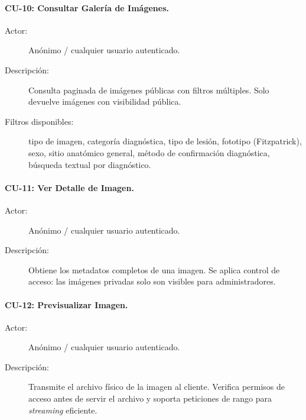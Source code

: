 \paragraph{CU-10: Consultar Galería de Imágenes.}
\begin{description}
    \item[Actor:] Anónimo / cualquier usuario autenticado.
    \item[Descripción:] Consulta paginada de imágenes públicas con filtros múltiples. Solo devuelve imágenes con visibilidad pública.
    \item[Filtros disponibles:] tipo de imagen, categoría diagnóstica, tipo de lesión, fototipo (Fitzpatrick), sexo, sitio anatómico general, método de confirmación diagnóstica, búsqueda textual por diagnóstico.
\end{description}

\paragraph{CU-11: Ver Detalle de Imagen.}
\begin{description}
    \item[Actor:] Anónimo / cualquier usuario autenticado.
    \item[Descripción:] Obtiene los metadatos completos de una imagen. Se aplica control de acceso: las imágenes privadas solo son visibles para administradores.
\end{description}

\paragraph{CU-12: Previsualizar Imagen.}
\begin{description}
    \item[Actor:] Anónimo / cualquier usuario autenticado.
    \item[Descripción:] Transmite el archivo físico de la imagen al cliente. Verifica permisos de acceso antes de servir el archivo y soporta peticiones de rango para \textit{streaming} eficiente.
\end{description}

